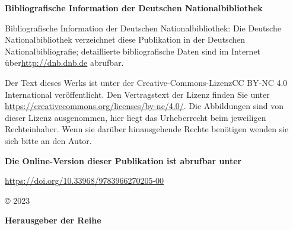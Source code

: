 \begin{flushleft}
\begin{FlushLeft}
\textbf{Bibliografische Information der Deutschen Nationalbibliothek}

Bibliografische Information der Deutschen Nationalbibliothek: Die Deutsche Nationalbibliothek verzeichnet diese Publikation in der Deutschen Nationalbibliografie; detaillierte bibliografische Daten sind im Internet über\linebreak \url{http://dnb.dnb.de} abrufbar.

\vspace{1em}

Der Text dieses Werks ist unter der Creative-Commons-Lizenz\linebreak CC BY-NC 4.0 International veröffentlicht. Den Vertragstext der Lizenz finden Sie unter \url{https://creativecommons.org/licenses/by-nc/4.0/}.
Die Abbildungen sind von dieser Lizenz ausgenommen, hier liegt das Urheberrecht beim jeweiligen Rechteinhaber.
Wenn sie darüber hinausgehende Rechte benötigen wenden sie sich bitte an den Autor.
\end{FlushLeft}


\textbf{Die Online-Version dieser Publikation ist abrufbar unter}

\url{https://doi.org/10.33968/9783966270205-00}

\vspace{1em}

© 2023 \myName

\vspace{1em}

\textbf{Herausgeber der Reihe}


\end{flushleft}
